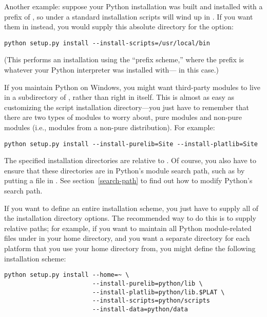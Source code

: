 \documentclass{howto}
\begin{document}
Another \UNIX{} example: suppose your Python installation was built and
installed with a prefix of , so under a standard 
installation scripts will wind up in .  If
you want them in  instead, you would supply this
absolute directory for the  option:

\begin{verbatim}
python setup.py install --install-scripts=/usr/local/bin
\end{verbatim}

(This performs an installation using the ``prefix scheme,'' where the
prefix is whatever your Python interpreter was installed with---
 in this case.)

If you maintain Python on Windows, you might want third-party modules to
live in a subdirectory of , rather than right in
 itself.  This is almost as easy as customizing the
script installation directory---you just have to remember that there are
two types of modules to worry about, pure modules and non-pure modules
(i.e., modules from a non-pure distribution).  For example:

\begin{verbatim}
python setup.py install --install-purelib=Site --install-platlib=Site
\end{verbatim}

The specified installation directories are relative to
.  Of course, you also have to ensure that these
directories are in Python's module search path, such as by putting a
 file in .  See section~\ref{search-path}
to find out how to modify Python's search path.

If you want to define an entire installation scheme, you just have to
supply all of the installation directory options.  The recommended way
to do this is to supply relative paths; for example, if you want to
maintain all Python module-related files under  in your
home directory, and you want a separate directory for each platform that
you use your home directory from, you might define the following
installation scheme:

\begin{verbatim}
python setup.py install --home=~ \
                        --install-purelib=python/lib \
                        --install-platlib=python/lib.$PLAT \
                        --install-scripts=python/scripts
                        --install-data=python/data
\end{verbatim}
\end{document}
